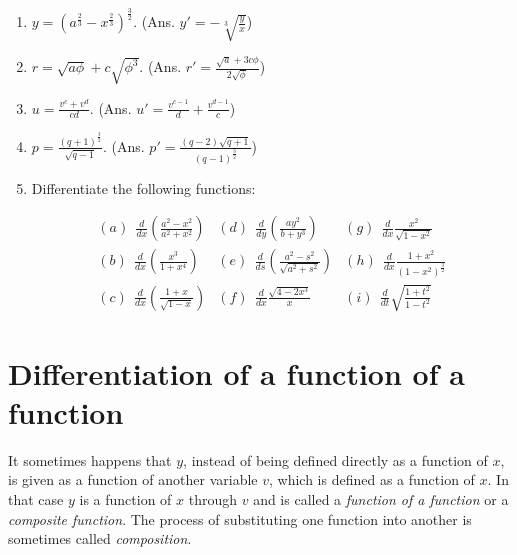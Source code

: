 \begin{enumerate}
\item
$y = (a^{\frac{2}{3}} - x^{\frac{2}{3}})^{\frac{3}{2}}$. 	
 \qquad (Ans.	$y' = -\sqrt[3]{\frac{y}{x}}$)


\item
$r = \sqrt{a\phi} + c\sqrt{\phi^3}$.
  \qquad (Ans.	$r' = \frac{\sqrt{a} + 3c\phi}{2\sqrt{\phi}}$)

\item
$u = \frac{v^c + v^d}{cd}$. 	
 \qquad (Ans.	$u' = \frac{v^{c - 1}}{d} + \frac{v^{d - 1}}{c}$)

\item
$p = \frac{(q + 1)^{\frac{3}{2}}}{\sqrt{q - 1}}$. 
 \qquad (Ans.	$p' = \frac{(q - 2)\sqrt{q + 1}}{(q - 1)^{\frac{3}{2}}}$)

\item
Differentiate the following functions:

\[
\begin{array}{lll}
(a) \ \ \frac{d}{dx} \left ( \frac{a^2 - x^2}{a^2 + x^2} \right ) & 	(d) \ \ \frac{d}{dy} \left ( \frac{ay^2}{b + y^3} \right ) & 	(g) \ \ \frac{d}{dx} \frac{x^2}{\sqrt{1 - x^2}}\\
(b) \ \ \frac{d}{dx} \left ( \frac{x^3}{1 + x^4} \right ) & 	(e) \ \ \frac{d}{ds} \left ( \frac{a^2 - s^2}{\sqrt{a^2 + s^2}} \right ) & 	(h) \ \ \frac{d}{dx} \frac{1 + x^2}{(1 - x^2)^{\frac{3}{2}}}\\
(c) \ \ \frac{d}{dx} \left ( \frac{1 + x}{\sqrt{1 - x}} \right ) & 	(f) \ \ \frac{d}{dx} \frac{\sqrt{4 - 2x^3}}{x} & 	(i) \ \ \frac{d}{dt} \sqrt{\frac{1 + t^2}{1 - t^2}}
\end{array}
\]

\end{enumerate}

\section{Differentiation of a function of a function}
\label{sec:42}

It sometimes happens that $y$, instead of being defined directly as 
a function of $x$, is given as a function of another variable $v$, which is 
defined as a function of $x$. In that case $y$ is a function of $x$ through 
$v$ and is called a {\it function of a function}
or a {\it composite function}. %
The process of substituting one function into another is sometimes  %
called {\it composition}. %

